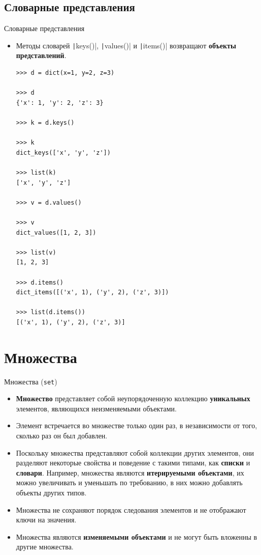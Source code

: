 \documentclass[aspectratio=169, mathserif]{beamer}%
\begin{document}
\subsection{Словарные представления}

\begin{frame}[fragile]{Словарные представления}
\scriptsize
\begin{itemize}
\item Методы словарей \texttt|keys()|, \texttt|values()| и \texttt|items()| возвращают \textcolor{extraorange}{\textbf{объекты представлений}}. 

\begin{verbatim}
>>> d = dict(x=1, y=2, z=3)

>>> d
{'x': 1, 'y': 2, 'z': 3}

>>> k = d.keys()

>>> k
dict_keys(['x', 'y', 'z'])

>>> list(k)
['x', 'y', 'z']

>>> v = d.values()

>>> v
dict_values([1, 2, 3])

>>> list(v)
[1, 2, 3]

>>> d.items()
dict_items([('x', 1), ('y', 2), ('z', 3)])

>>> list(d.items())
[('x', 1), ('y', 2), ('z', 3)]
\end{verbatim}
\end{itemize}
\vfill
\end{frame}


\section{Множества}
\sectionframe

\begin{frame}[fragile]{Множества (\texttt{set})}
	\scriptsize
	\begin{itemize}
		\item \textcolor{extraorange}{\textbf{Множество}} представляет собой неупорядоченную коллекцию \textbf{уникальных} элементов, являющихся  неизменяемыми объектами. 
		\item Элемент встречается во множестве только один раз, в независимости от того, сколько раз он был добавлен.
		\item Поскольку множества представляют собой коллекции других элементов, они разделяют некоторые свойства и поведение с такими типами, как \textbf{списки} и \textbf{словари}. Например, множества являются \textbf{итерируемыми объектами}, их можно увеличивать и уменьшать по требованию, в них можно добавлять объекты других типов.
		
		\item Множества не сохраняют порядок следования элементов и не отображают ключи на значения.
		\item Множества являются \textcolor{extraorange}{\textbf{изменяемыми объектами}} и не могут быть вложенны в другие множества.
	\end{itemize}
	\vfill
\end{frame}
\end{document}

